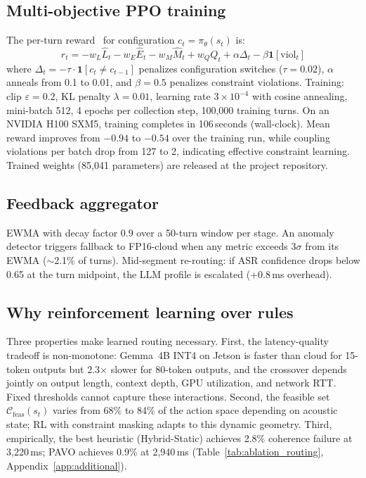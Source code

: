\documentclass{article}
\begin{document}
\subsection{Multi-objective PPO training}

The per-turn reward~\citep{schulman2017ppo} for configuration $c_t=\pi_\theta(s_t)$ is:
\begin{equation}
r_t = -w_L\hat{L}_t - w_E\hat{E}_t - w_M\hat{M}_t + w_QQ_t + \alpha\Delta_t - \beta\mathbf{1}[\text{viol}_t]
\label{eq:reward}
\end{equation}
where $\Delta_t=-\tau\cdot\mathbf{1}[c_t\neq c_{t-1}]$ penalizes configuration switches ($\tau=0.02$), $\alpha$ anneals from 0.1 to 0.01, and $\beta=0.5$ penalizes constraint violations. Training: clip $\varepsilon=0.2$, KL penalty $\lambda=0.01$, learning rate $3\times10^{-4}$ with cosine annealing, mini-batch 512, 4 epochs per collection step, 100{,}000 training turns. On an NVIDIA H100 SXM5, training completes in 106\,seconds (wall-clock). Mean reward improves from $-0.94$ to $-0.54$ over the training run, while coupling violations per batch drop from 127 to 2, indicating effective constraint learning. Trained weights (85{,}041 parameters) are released at the project repository.

\subsection{Feedback aggregator}

EWMA with decay factor 0.9 over a 50-turn window per stage. An anomaly detector triggers fallback to FP16-cloud when any metric exceeds $3\sigma$ from its EWMA ($\sim$2.1\% of turns). Mid-segment re-routing: if ASR confidence drops below 0.65 at the turn midpoint, the LLM profile is escalated (+0.8\,ms overhead).

\subsection{Why reinforcement learning over rules}
\label{sec:why_rl}

Three properties make learned routing necessary. First, the latency-quality tradeoff is non-monotone: Gemma~4B INT4 on Jetson is faster than cloud for 15-token outputs but 2.3$\times$ slower for 80-token outputs, and the crossover depends jointly on output length, context depth, GPU utilization, and network RTT. Fixed thresholds cannot capture these interactions. Second, the feasible set $\mathcal{C}_{\text{feas}}(s_t)$ varies from 68\% to 84\% of the action space depending on acoustic state; RL with constraint masking adapts to this dynamic geometry. Third, empirically, the best heuristic (Hybrid-Static) achieves 2.8\% coherence failure at 3{,}220\,ms; PAVO achieves 0.9\% at 2{,}940\,ms (Table~\ref{tab:ablation_routing}, Appendix~\ref{app:additional}).
\end{document}
